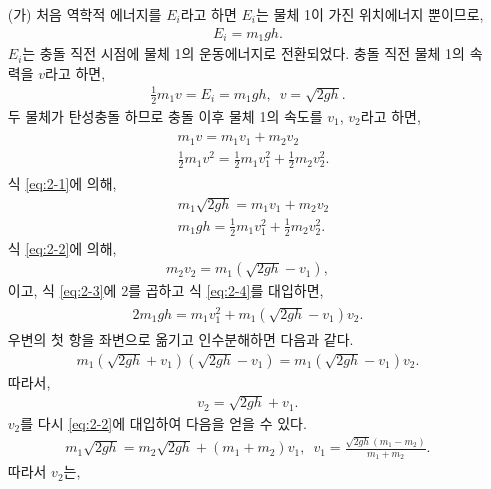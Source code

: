 \documentclass[floatfix,nofootinbib,superscriptaddress,fleqn]{revtex4-2}
\begin{document}
\begin{itemize}
  \item[(가)] 처음 역학적 에너지를 $E_i$라고 하면 $E_i$는 물체 1이 가진 위치에너지 뿐이므로,
  \begin{align}
    E_i = m_1gh.
  \end{align} 
  $E_i$는 충돌 직전 시점에 물체 1의 운동에너지로 전환되었다. 충돌 직전 물체 1의 속력을 $v$라고
  하면,
  \begin{align}\label{eq:2-1}
  \frac{1}{2}m_1v = E_i = m_1gh,\,\,\, v = \sqrt{2gh}.  
  \end{align} 
  두 물체가 탄성충돌 하므로 충돌 이후
  물체 1의 속도를 $v_1$, $v_2$라고 하면,
  \begin{align}
    \begin{split}
      &m_1v = m_1 v_1 + m_2 v_2  \\
      &\frac{1}{2}m_1v^2=\frac{1}{2}m_1v_1^2+\frac{1}{2}m_2v_2^2.
    \end{split}
  \end{align}
  식 \eqref{eq:2-1}에 의해,
  \begin{align}
      \label{eq:2-2}&m_1\sqrt{2gh} = m_1 v_1 + m_2 v_2  \\
      \label{eq:2-3}&m_1gh=\frac{1}{2}m_1v_1^2+\frac{1}{2}m_2v_2^2.
  \end{align}
  식 \eqref{eq:2-2}에 의해,
  \begin{align}\label{eq:2-4}
    m_2v_2 = m_1(\sqrt{2gh}-v_1),
  \end{align}
  이고, 식 \eqref{eq:2-3}에 2를 곱하고 식 \eqref{eq:2-4}를 대입하면,
  \begin{align}
    \begin{split}
      2m_1gh = m_1v_1^2+m_1(\sqrt{2gh}-v_1)v_2.
    \end{split}
  \end{align}
  우변의 첫 항을 좌변으로 옮기고 인수분해하면 다음과 같다.
  \begin{align}
    m_1(\sqrt{2gh}+v_1)(\sqrt{2gh}-v_1) = m_1(\sqrt{2gh}-v_1)v_2.
  \end{align}
  따라서,
  \begin{align}
    v_2 = \sqrt{2gh} + v_1.
  \end{align}
  $v_2$를 다시 \eqref{eq:2-2}에 대입하여 다음을 얻을 수 있다.
  \begin{align}
    m_1\sqrt{2gh} = m_2\sqrt{2gh}+ (m_1 + m_2)v_1,\,\,\,
    v_1 =   \frac{\sqrt{2gh}(m_1-m_2)}{m_1+m_2}.
  \end{align}
  따라서 $v_2$는,
  \begin{align}\label{eq:2-5}

\end{align}
\end{itemize}
\end{document}
